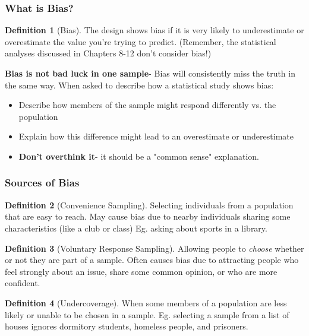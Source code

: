 \documentclass[12pt, a4paper]{article}
\theoremstyle{definition}
\newtheorem{definition}{Definition}
\begin{document}
\subsubsection{What is Bias?}
\begin{definition}[Bias]
    The design shows bias if it is very likely to underestimate or overestimate the value you're trying to predict.
    (Remember, the statistical analyses discussed in Chapters 8-12 don't consider bias!)
\end{definition}

\textbf{Bias is not bad luck in one sample}- Bias will consistently miss the truth in the same way.
When asked to describe how a statistical study shows bias:
\begin{itemize}
    \item Describe how members of the sample might respond differently vs. the population
    \item Explain how this difference might lead to an overestimate or underestimate
    \item \textbf{Don't overthink it}- it should be a "common sense" explanation.
\end{itemize}

\subsubsection{Sources of Bias}

\begin{definition}[Convenience Sampling]
    Selecting individuals from a population that are easy to reach.
    May cause bias due to nearby individuals sharing some characteristics (like a club or class)
    Eg. asking about sports in a library.
\end{definition}

\begin{definition}[Voluntary Response Sampling]
    Allowing people to \textit{choose} whether or not they are part of a sample.
    Often causes bias due to attracting people who feel strongly about an issue, share some common opinion, or who are more confident.
\end{definition}

\begin{definition}[Undercoverage]
    When some members of a population are less likely or unable to be chosen in a sample.
    Eg. selecting a sample from a list of houses ignores dormitory students, homeless people, and prisoners.
\end{definition}
\end{document}
